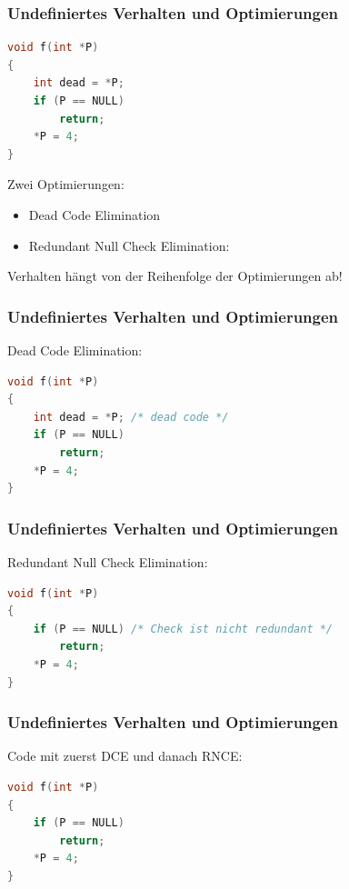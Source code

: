 \documentclass[12pt,compress]{beamer}
\begin{document}
\begin{frame}[fragile]
\frametitle{Undefiniertes Verhalten und Optimierungen}

\begin{lstlisting}[language=C,basicstyle=\ttfamily\small,keywordstyle=\color{red}]
void f(int *P)
{
    int dead = *P;
    if (P == NULL)
        return;
    *P = 4;
}
\end{lstlisting}

\vfill
Zwei Optimierungen:
\begin{itemize}
\item Dead Code Elimination
\item Redundant Null Check Elimination:
\end{itemize}

\vfill

Verhalten hängt von der Reihenfolge der Optimierungen ab!
\end{frame}


\begin{frame}[fragile]
\frametitle{Undefiniertes Verhalten und Optimierungen}

Dead Code Elimination:

\vfill

\begin{lstlisting}[language=C,basicstyle=\ttfamily\small,keywordstyle=\color{red}]
void f(int *P)
{
    int dead = *P; /* dead code */
    if (P == NULL)
        return;
    *P = 4;
}
\end{lstlisting}
\end{frame}


\begin{frame}[fragile]
\frametitle{Undefiniertes Verhalten und Optimierungen}

Redundant Null Check Elimination:

\vfill

\begin{lstlisting}[language=C,basicstyle=\ttfamily\small,keywordstyle=\color{red}]
void f(int *P)
{
    if (P == NULL) /* Check ist nicht redundant */
        return;
    *P = 4;
}
\end{lstlisting}
\end{frame}


\begin{frame}[fragile]
\frametitle{Undefiniertes Verhalten und Optimierungen}

Code mit zuerst DCE und danach RNCE:

\vfill

\begin{lstlisting}[language=C,basicstyle=\ttfamily\small,keywordstyle=\color{red}]
void f(int *P)
{
    if (P == NULL)
        return;
    *P = 4;
}
\end{lstlisting}
\end{frame}
\end{document}
